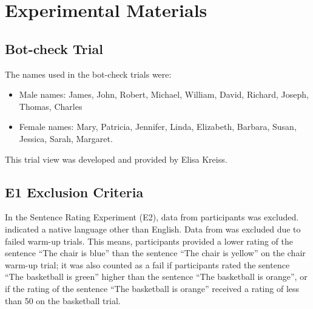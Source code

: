 \section{Experimental Materials}
\subsection{Bot-check Trial}
The names used in the bot-check trials were: 
\begin{itemize}
\item Male names: James, John, Robert, Michael, William, David, Richard, Joseph, Thomas, Charles 
\item Female names: Mary, Patricia, Jennifer, Linda, Elizabeth, Barbara, Susan, Jessica, Sarah, Margaret. 
\end{itemize}
This trial view was developed and provided by Elisa Kreiss. 
\subsection{E1 Exclusion Criteria}
In the Sentence Rating Experiment (E2), data from  participants was excluded.  indicated a native language other than English. Data from  was excluded due to failed warm-up trials. This means, participants provided a lower rating of the sentence “The chair is blue” than the sentence “The chair is yellow” on the chair warm-up trial; it was also counted as a fail if participants rated the sentence “The basketball is green” higher than the sentence “The basketball is orange”, or if the rating of the sentence “The basketball is orange” received a rating of less than 50 on the basketball trial.

